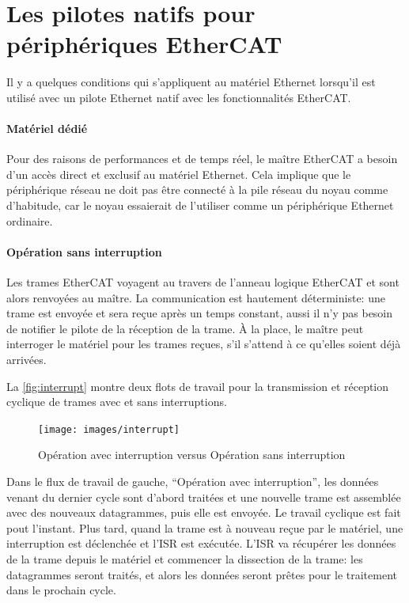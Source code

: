 \documentclass[a4paper,12pt,BCOR=6mm,bibtotoc,idxtotoc]{scrbook}
\begin{document}

\section{Les pilotes natifs pour p\'eriph\'eriques EtherCAT}
\label{sec:native-drivers}

Il y a quelques conditions qui s'appliquent au mat\'eriel Ethernet
lorsqu'il est utilis\'e avec un pilote Ethernet natif avec les
fonctionnalit\'es EtherCAT.

\paragraph{Mat\'eriel d\'edi\'e} Pour des raisons de performances et
de temps r\'eel, le ma\^itre EtherCAT a besoin d'un acc\`es direct et
exclusif au mat\'eriel Ethernet. Cela implique que le p\'eriph\'erique
r\'eseau ne doit pas \^etre connect\'e \`a la pile r\'eseau du noyau
comme d'habitude, car le noyau essaierait de l'utiliser comme un
p\'eriph\'erique Ethernet ordinaire.

\paragraph{Op\'eration sans interruption}
Les trames EtherCAT voyagent au travers de l'anneau logique EtherCAT
et sont alors renvoy\'ees au ma\^itre.  La communication est hautement
d\'eterministe: une trame est envoy\'ee et sera re\c{c}ue apr\`es un
temps constant, aussi il n'y pas besoin de notifier le pilote de la
r\'eception de la trame. \`A la place, le ma\^itre peut interroger le
mat\'eriel pour les trames re\c{c}ues, s'il s'attend \`a ce qu'elles
soient d\'ej\`a arriv\'ees.


La \autoref{fig:interrupt} montre deux flots de travail pour la
transmission et r\'eception cyclique de trames avec et sans
interruptions.

\begin{figure}[htbp]
  \centering
  \texttt{[image: images/interrupt]}
  \caption{Op\'eration avec interruption versus Op\'eration sans interruption}
  \label{fig:interrupt}
\end{figure}

Dans le flux de travail de gauche, ``Op\'eration avec interruption'',
les donn\'ees venant du dernier cycle sont d'abord trait\'ees et une
nouvelle trame est assembl\'ee avec des nouveaux datagrammes, puis
elle est envoy\'ee.  Le travail cyclique est fait pout l'instant.
Plus tard, quand la trame est \`a nouveau re\c{c}ue par le mat\'eriel,
une interruption est d\'eclench\'ee et l'ISR est ex\'ecut\'ee.  L'ISR
va r\'ecup\'erer les donn\'ees de la trame depuis le mat\'eriel et
commencer la dissection de la trame: les datagrammes seront trait\'es,
et alors les donn\'ees seront pr\^etes pour le traitement dans le
prochain cycle.
\end{document}
